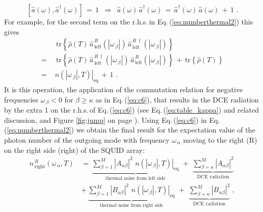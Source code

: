 %
\begin{equation} \label{eq:c5}
\left[ \hat{a}(\omega), \hat{a}^{\dagger}(\omega) \right] \, = \, 1 \, \, \, \Rightarrow \, \, \, 
\hat{a}(\omega) \, \hat{a}^{\dagger}(\omega) \, = \, \hat{a}^{\dagger}(\omega) \, \hat{a}(\omega) \, + \, 1 \, \, .
\end{equation}
%
For example, for the second term on the r.h.s.\,in Eq.\,(\ref{eq:numberthermal2}) this gives
%
\begin{equation} \label{eq:c6}
\begin{split}
& \, \, \, \text{tr} \left\{ \hat{\rho}(T) \,
\hat{a}_{\,\text{left}}^{\,R}(|\omega_{\,\beta}|) \, 
\hat{a}_{\,\text{left}}^{\,R\,\dagger}(|\omega_{\,\beta}|) \right\} \\[3mm]
= & \, \, \, \text{tr} \left\{ \hat{\rho}(T) \,
\hat{a}_{\,\text{left}}^{\,R\,\dagger}(|\omega_{\,\beta}|) \, 
\hat{a}_{\,\text{left}}^{\,R}(|\omega_{\,\beta}|) \right\} \, + \, 
\text{tr} \left\{ \hat{\rho}(T) \right\} \\[3mm]
= & \, \, \left. n(|\omega_{\,\beta}|, T) \right|_{\text{eq}} \, + \, 1 \, \, .
\end{split}
\end{equation}
%
It is this operation, the application of the commutation relation for negative frequencies
$\omega_{\,\beta} < 0$ for $\beta \ge \kappa$ as in Eq.\,(\ref{eq:c6}), that results in the DCE 
radiation by the extra 1 on the r.h.s.\,of Eq.\,(\ref{eq:c6}) (see Eq.\,(\ref{eq:table_kappa})
and related discussion, and Figure \ref{fig:jump} on page \pageref{fig:jump}).
Using Eq.\,(\ref{eq:c6}) in Eq.\,(\ref{eq:numberthermal2}) we obtain the final result for the
expectation value of the photon number of the outgoing mode with frequency 
$\omega_{\,\alpha}$ moving to the right (R) on the right side (right) of the SQUID array:
%
\begin{equation} \label{eq:dce_right}
\begin{split}
n_{\,\text{right}}^{\,R}(\omega_{\,\alpha}, T) \, & = \,
\underbrace{\sum\limits_{\beta=1}^{M} \left|A_{\alpha \beta}\right|^2 \, \,
\left. n(|\omega_{\,\beta}|, T) \right|_{\text{eq}}}_{\text{thermal noise from left side}}
\, \, + \, \,
\underbrace{\sum\limits_{\beta=\kappa}^{M} \left|A_{\alpha \beta}\right|^2}_{\text{DCE radiation}} \\[4mm]
& + \, \underbrace{\sum\limits_{\beta=1}^{M} \left|B_{\alpha \beta}\right|^2 \, \,
\left. n(|\omega_{\,\beta}|, T) \right|_{\text{eq}}}_{\text{thermal noise from right side}}
\, \, + \, \,
\underbrace{\sum\limits_{\beta=\kappa}^{M} \left|B_{\alpha \beta}\right|^2}_{\text{DCE radiation}} \, \, ,
\end{split}
\end{equation}

